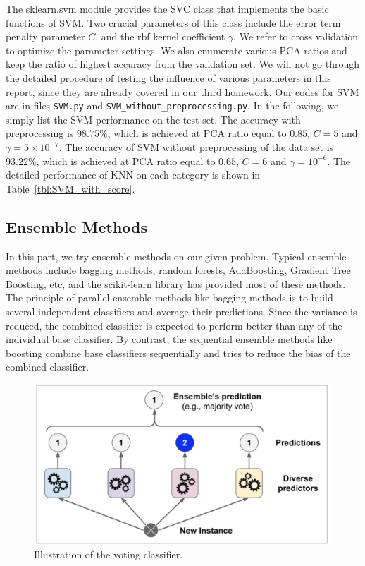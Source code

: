 \documentclass{article}
\begin{document}
The sklearn.svm module provides the SVC class that implements the basic functions of SVM. Two crucial parameters of this class include the error term penalty parameter $C$, and the rbf kernel coefficient $\gamma$. We refer to cross validation to optimize the parameter settings. We also enumerate various PCA ratios and keep the ratio of highest accuracy from the validation set. We will not go through the detailed procedure of testing the influence of various parameters in this report, since they are already covered in our third homework. Our codes for SVM are in files \texttt{SVM.py} and \texttt{SVM\_without\_preprocessing.py}. In the following, we simply list the SVM performance on the test set. The accuracy with preprocessing is $98.75\%$, which is achieved at PCA ratio equal to $0.85$, $C=5$ and $\gamma = 5 \times 10^{-7}$. The accuracy of SVM without preprocessing of the data set is $93.22\%$, which is achieved at PCA ratio equal to $0.65$, $C=6$ and $\gamma = 10^{-6}$. The detailed performance of KNN on each category is shown in Table~\ref{tbl:SVM_with_score}.

\subsection{Ensemble Methods}
In this part, we try ensemble methods on our given problem. Typical ensemble methods include bagging methods, random forests, AdaBoosting, Gradient Tree Boosting, etc, and the scikit-learn library has provided most of these methods. The principle of parallel ensemble methods like bagging methods is to build several independent classifiers and average their predictions. Since the variance is reduced, the combined classifier is expected to perform better than any of the individual base classifier. By contrast, the sequential ensemble methods like boosting combine base classifiers sequentially and tries to reduce the bias of the combined classifier.

\begin{figure}[!htb]
	\centering\includegraphics[width=1.0\textwidth]{fig/votingclassifier}
	\caption{Illustration of the voting classifier.}\label{fig:voting}
\end{figure}
\end{document}
